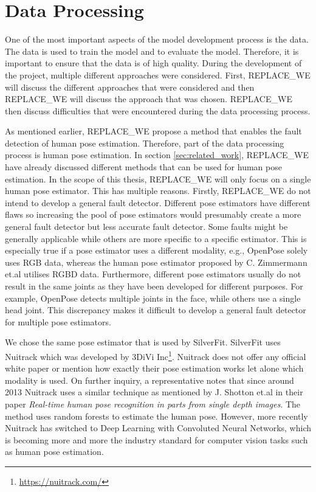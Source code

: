 \chapter{Data Processing}
\label{sec:data_processing}

One of the most important aspects of the model development process is the data. The data is used to train the model and to evaluate the model. Therefore, it is important to ensure that the data is of high quality. During the development of the project, multiple different approaches were considered. First, REPLACE_WE will discuss the different approaches that were considered and then REPLACE_WE will discuss the approach that was chosen. REPLACE_WE then discuss difficulties that were encountered during the data processing process.

As mentioned earlier, REPLACE_WE propose a method that enables the fault detection of human pose estimation. Therefore, part of the data processing process is human pose estimation. In section \ref{sec:related_work}, REPLACE_WE have already discussed different methods that can be used for human pose estimation. In the scope of this thesis, REPLACE_WE will only focus on a single human pose estimator. This has multiple reasons. Firstly, REPLACE_WE do not intend to develop a general fault detector. Different pose estimators have different flaws so increasing the pool of pose estimators would presumably create a more general fault detector but less accurate fault detector. Some faults might be generally applicable while others are more specific to a specific estimator. This is especially true if a pose estimator uses a different modality, e.g., OpenPose solely uses RGB data, whereas the human pose estimator proposed by C. Zimmermann et.al utilises RGBD data\cite{OpenPosePose, RGBDHPEforRoboticTaskLearning}. Furthermore, different pose estimators usually do not result in the same joints as they have been developed for different purposes. For example, OpenPose detects multiple joints in the face, while others use a single head joint. This discrepancy makes it difficult to develop a general fault detector for multiple pose estimators. 

We chose the same pose estimator that is used by SilverFit. SilverFit uses Nuitrack which was developed by 3DiVi Inc\footnote{\url{https://nuitrack.com/}}. Nuitrack does not offer any official white paper or mention how exactly their pose estimation works let alone which modality is used. On further inquiry, a representative notes that since around 2013 Nuitrack uses a similar technique as mentioned by J. Shotton et.al in their paper \textit{Real-time human pose recognition in parts from single depth images}\cite{EarlyRGBDHPE}. The method uses random forests to estimate the human pose. However, more recently Nuitrack has switched to Deep Learning with Convoluted Neural Networks, which is becoming more and more the industry standard for computer vision tasks such as human pose estimation.




